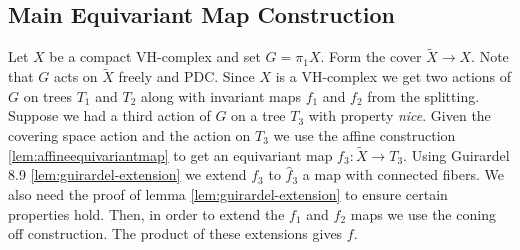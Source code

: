 \documentclass{article}
\theoremstyle{mystyle}
\newtheorem{lem}{Lemma}[section]
\theoremstyle{remark}
\begin{document}


\subsection{Main Equivariant Map Construction}
Let \(X\) be a compact VH-complex and set \(G= \pi_{1} X\). Form the cover \(\widetilde{X} \to X\). Note that \(G\) acts on \(\widetilde X\) freely and PDC. Since \(X\) is a VH-complex we get two actions of \(G\) on trees \(T_{1}\) and \(T_{2}\) along with invariant maps \(f_{1}\) and \(f_{2}\) from the splitting. Suppose we had a third action of \(G\) on a tree \(T_{3}\) with property {\em nice}. Given the covering space action and the action on \(T_{3}\) we use the affine construction \ref{lem:affineequivariantmap} to get an equivariant map \(f_{3} : \widetilde X \to T_{3}\). Using Guirardel 8.9 \ref{lem:guirardel-extension} we extend \(f_{3}\) to \(\widehat f_{3}\) a map with connected fibers. We also need the proof of lemma \ref{lem:guirardel-extension} to ensure certain properties hold. Then, in order to extend the \(f_{1}\) and \(f_{2}\) maps we use the coning off construction. The product of these extensions gives \(f\).
    
\end{document}
